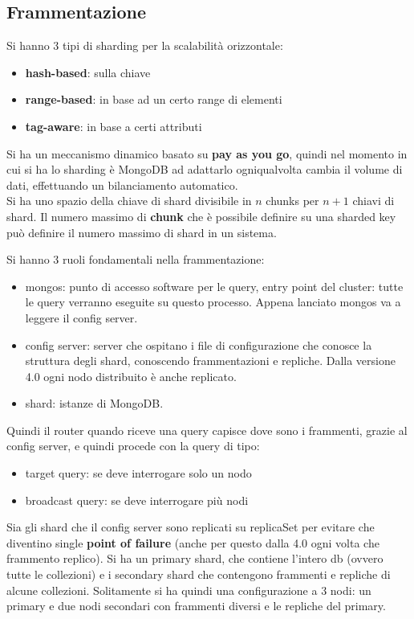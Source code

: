 \subsection{Frammentazione}
Si hanno 3 tipi di sharding per la scalabilità orizzontale:
\begin{itemize}
    \item \textbf{hash-based}: sulla chiave
    \item \textbf{range-based}: in base ad un certo range di elementi
    \item \textbf{tag-aware}: in base a certi attributi
\end{itemize}
Si ha un meccanismo dinamico basato su\textbf{ pay as you go}, quindi nel momento in cui si ha lo sharding è MongoDB ad adattarlo ogniqualvolta cambia il volume di dati, effettuando un bilanciamento automatico. \\
Si ha uno spazio della chiave di shard divisibile in $n$ chunks per $n+1$ chiavi di shard. 
Il numero massimo di \textbf{chunk} che è possibile definire su una sharded key può definire il numero massimo di shard in un sistema.

Si hanno 3 ruoli fondamentali nella frammentazione:
\begin{itemize}
    \item mongos: punto di accesso software per le query, entry point del cluster: tutte le query verranno eseguite su questo processo. Appena lanciato mongos va a leggere il config server.
    \item config server: server che ospitano i file di configurazione che conosce la struttura degli shard, conoscendo frammentazioni e repliche. Dalla versione 4.0 ogni nodo distribuito è anche replicato.
    \item shard: istanze di MongoDB.
\end{itemize}

Quindi il router quando riceve una query capisce dove sono i frammenti, grazie al config server, e quindi procede con la query di tipo:
\begin{itemize}
    \item target query: se deve interrogare solo un nodo
    \item broadcast query: se deve interrogare più nodi
\end{itemize}

Sia gli shard che il config server sono replicati su replicaSet per evitare che diventino single \textbf{point of failure} (anche per questo dalla 4.0 ogni volta che frammento replico).
Si ha un primary shard, che contiene l’intero db (ovvero tutte le collezioni) e i secondary shard che contengono frammenti e repliche di alcune collezioni. 
Solitamente si ha quindi una configurazione a 3 nodi: un primary e due nodi secondari con frammenti diversi e le repliche del primary.
